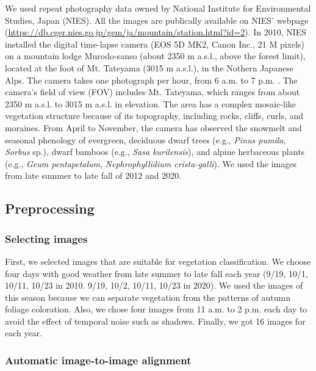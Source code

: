 \documentclass{article}
\begin{document}
We used repeat photography data owned by National Institute for
Environmental Studies, Japan (NIES). All the images are publically
available on NIES' webpage
(\url{https://db.cger.nies.go.jp/gem/ja/mountain/station.html?id=2}). In
2010, NIES installed the digital time-lapse camera (EOS 5D MK2, Canon
Inc., 21 M pixels) on a mountain lodge Murodo-sanso (about 2350 m
a.s.l., above the forest limit), located at the foot of Mt. Tateyama
(3015 m a.s.l.), in the Nothern Japanese Alps. The camera takes one
photograph per hour, from 6 a.m. to 7 p.m. . The camera's field of view
(FOV) includes Mt. Tateyama, which ranges from about 2350 m a.s.l. to
3015 m a.s.l. in elevation. The area has a complex mosaic-like
vegetation structure because of its topography, including rocks, cliffs,
curls, and moraines. From April to November, the camera has observed the
snowmelt and seasonal phenology of evergreen, deciduous dwarf trees
(e.g., \emph{Pinus pumila}, \emph{Sorbus} sp.), dwarf bamboos (e.g.,
\emph{Sasa kurilensis}), and alpine herbaceous plants (e.g., \emph{Geum
pentapetalum}, \emph{Nephrophyllidium crista-galli}). We used the images
from late summer to late fall of 2012 and 2020.

\hypertarget{preprocessing}{%
\subsection{Preprocessing}\label{preprocessing}}

\hypertarget{selecting-images}{%
\subsubsection{Selecting images}\label{selecting-images}}

First, we selected images that are suitable for vegetation
classification. We choose four days with good weather from late summer
to late fall each year (9/19, 10/1, 10/11, 10/23 in 2010. 9/19, 10/2,
10/11, 10/23 in 2020). We used the images of this season because we can
separate vegetation from the patterns of autumn foliage coloration.
Also, we chose four images from 11 a.m. to 2 p.m. each day to avoid the
effect of temporal noise such as shadows. Finally, we got 16 images for
each year.

\hypertarget{automatic-image-to-image-alignment}{%
\subsubsection{Automatic image-to-image
alignment}\label{automatic-image-to-image-alignment}}
\end{document}
